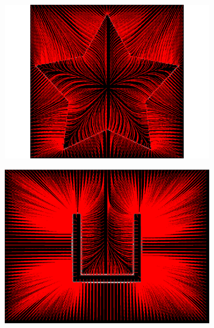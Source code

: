 \begin{appendices}
\begin{figure}[H]
\centering
\begin{subfigure}[c]{0.4\linewidth}
\centering
\includegraphics[width=\textwidth]{Chapters/Images/Conc/gvfsstream}
\caption{}
\end{subfigure}
\begin{subfigure}[c]{0.4\linewidth}
\centering
\includegraphics[width=\textwidth]{Chapters/Images/Conc/gvfsqstream}
\caption{}
\end{subfigure}
\\
\begin{subfigure}[c]{0.4\linewidth}
\centering

\end{subfigure}
\end{figure}
\end{appendices}
